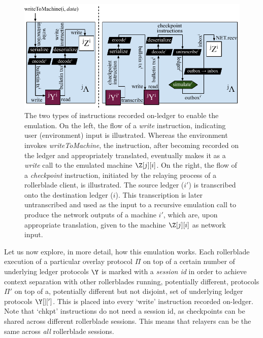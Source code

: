 \iflong
\begin{figure}
  \centering
  \includegraphics[width=\columnwidth,keepaspectratio]{figures/rollerblade-instructions.pdf}
  \caption{The two types of instructions recorded on-ledger to enable the emulation.
           On the left, the flow of a \emph{write} instruction, indicating user (environment)
           input is illustrated. Whereas the environment invokes \emph{writeToMachine}, the
           instruction, after becoming recorded on the ledger and appropriately translated,
           eventually makes it as a \emph{write} call to the emulated machine $\Z[j][i]$.
           On the right, the flow of a \emph{checkpoint} instruction, initiated by the relaying
           process of a rollerblade client, is illustrated. The source ledger ($i'$) is
           transcribed onto the destination ledger ($i$). This transcription is later
           untranscribed and used as the input to a recursive emulation call to produce
           the network outputs of a machine $i'$, which are, upon appropriate translation,
           given to the machine $\Z[j][i]$ as network input.}
  \label{fig.rollerblade-instructions}
\end{figure}
\fi

Let us now explore, in more detail, how this emulation works. Each rollerblade execution
of a particular overlay protocol $\Pi$ on top of a certain number of underlying ledger
protocols $\Y$ is marked with a \emph{session id} \sid in order to achieve context
separation with other rollerblades running, potentially different, protocols $\Pi'$
on top of a, potentially different but not disjoint, set of underlying ledger protocols
$\Y[][']$. This \sid is placed into every `write' instruction recorded on-ledger.
Note that `chkpt' instructions do not need a session id, as checkpoints can be
shared across different rollerblade sessions. This means that relayers can be the
same across \emph{all} rollerblade sessions.

